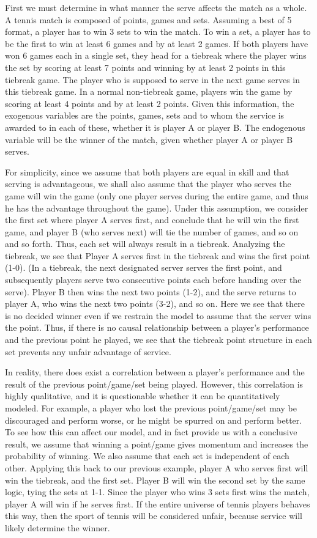 \documentclass[12pt]{article}
\begin{document}
First we must determine in what manner the serve affects the match as a whole. A tennis match is composed of points, games and sets. Assuming a best of 5 format, a player has to win 3 sets to win the match. To win a set, a player has to be the first to win at least 6 games and by at least 2 games. If both players have won 6 games each in a single set, they head for a tiebreak where the player wins the set by scoring at least 7 points and winning by at least 2 points in this tiebreak game. The player who is supposed to serve in the next game serves in this tiebreak game. In a normal non-tiebreak game, players win the game by scoring at least 4 points and by at least 2 points. Given this information, the exogenous variables are the points, games, sets and to whom the service is awarded to in each of these, whether it is player A or player B.  The endogenous variable will be the winner of the match, given whether player A or player B serves. 

For simplicity, since we assume that both players are equal in skill and that serving is advantageous, we shall also assume that the player who serves the game will win the game (only one player serves during the entire game, and thus he has the advantage throughout the game). Under this assumption, we consider the first set where player A serves first, and conclude that he will win the first game, and player B (who serves next) will tie the number of games, and so on and so forth. Thus, each set will always result in a tiebreak. Analyzing the tiebreak, we see that Player A serves first in the tiebreak and wins the first point (1-0). (In a tiebreak, the next designated server serves the first point, and subsequently players serve two consecutive points each before handing over the serve). Player B then wins the next two points (1-2), and the serve returns to player A, who wins the next two points (3-2), and so on. Here we see that there is no decided winner even if we restrain the model to assume that the server wins the point.  Thus, if there is no causal relationship between a player’s performance and the previous point he played, we see that the tiebreak point structure in each set prevents any unfair advantage of service. 

In reality, there does exist a correlation between a player’s performance and the result of the previous point/game/set being played. However, this correlation is highly qualitative, and it is questionable whether it can be quantitatively modeled. For example, a player who lost the previous point/game/set may be discouraged and perform worse, or he might be spurred on and perform better. To see how this can affect our model, and in fact provide us with a conclusive result, we assume that winning a point/game gives momentum and increases the probability of winning. We also assume that each set is independent of each other. Applying this back to our previous example, player A who serves first will win the tiebreak, and the first set. Player B will win the second set by the same logic, tying the sets at 1-1. Since the player who wins 3 sets first wins the match, player A will win if he serves first. If the entire universe of tennis players behaves this way, then the sport of tennis will be considered unfair, because service will likely determine the winner. 
\end{document}
